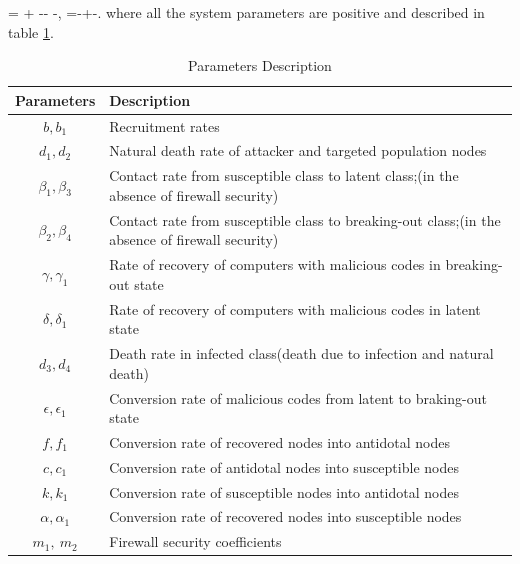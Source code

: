\ee
\be
{}=  + -- -,
\ee
\be
{}=-+-.
\ee
where all the system parameters are positive and described in table \ref{table1}.
\begin{center}
\begin{table}
\scriptsize
\footnotesize
\begin{tabular}{|c|l|}
  \hline
  \textbf{Parameters} & \textbf{Description }\\
  \hline
  $b,b_1$ & Recruitment rates\\
  \hline
  $d_1,d_2$ & Natural death rate of attacker and targeted population nodes\\
  \hline
  $\beta_1,\beta_3$ & Contact rate from susceptible class to latent class;(in the absence of firewall security) \\
  \hline
  $\beta_2,\beta_4$ & Contact rate from susceptible class to breaking-out class;(in the absence of firewall security) \\
  \hline
  $\gamma,\gamma_1$ & Rate of recovery of computers with malicious codes in breaking-out state \\
  \hline
  $\delta,\delta_1$ & Rate of recovery of computers with malicious codes in latent state \\
  \hline
  $d_3,d_4$ & Death rate in infected class(death due to infection and natural death) \\
  \hline
  $\epsilon,\epsilon_1$& Conversion rate of malicious codes from latent to braking-out state\\
  \hline
  $f,f_1$ & Conversion rate of recovered nodes into antidotal nodes \\
  \hline
  $c,c_1$ & Conversion rate of antidotal nodes into susceptible nodes \\
  \hline
  $k,k_1$ & Conversion rate of susceptible nodes into antidotal nodes \\
  \hline
  $\alpha,\alpha_1$ & Conversion rate of recovered nodes into susceptible nodes \\
  \hline
  $m_1, \ m_2$ & Firewall security coefficients\\
  \hline
\end{tabular}
\caption{Parameters Description}\label{table1}
\end{table}
\end{center}


